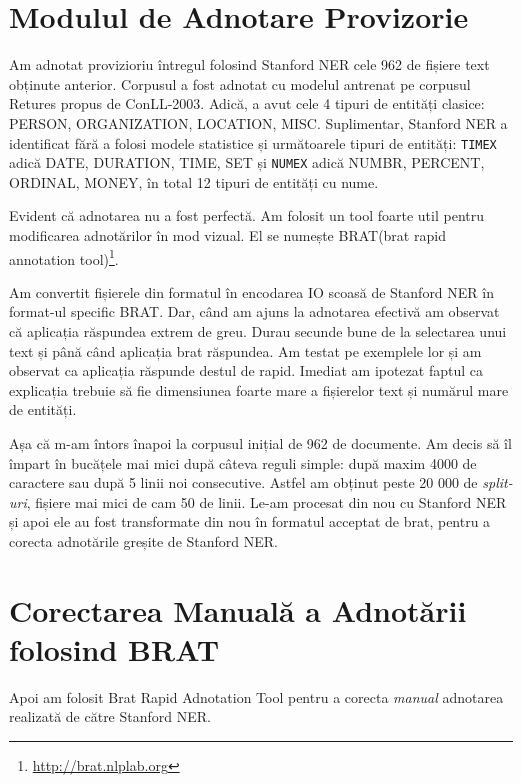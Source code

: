 
\section{Modulul de Adnotare Provizorie}

Am adnotat provizioriu întregul folosind Stanford NER cele 962 de fișiere text obținute anterior. Corpusul a fost adnotat cu modelul antrenat pe corpusul Retures propus de ConLL-2003. Adică, a avut cele 4 tipuri de entități clasice: PERSON, ORGANIZATION, LOCATION, MISC. Suplimentar, Stanford NER a identificat fără a folosi modele statistice și următoarele tipuri de entități: \texttt{TIMEX} adică DATE, DURATION, TIME, SET și \texttt{NUMEX} adică NUMBR, PERCENT, ORDINAL, MONEY, în total 12 tipuri de entități cu nume.

Evident că adnotarea nu a fost perfectă. Am folosit un tool foarte util pentru modificarea adnotărilor în mod vizual. El se numește BRAT(brat rapid annotation tool)\footnote{\url{http://brat.nlplab.org}}.

Am convertit fișierele din formatul în encodarea IO scoasă de Stanford NER în format-ul specific BRAT. Dar, când am ajuns la adnotarea efectivă am observat că aplicația răspundea extrem de greu. Durau secunde bune de la selectarea unui text și până când aplicația brat răspundea. Am testat pe exemplele lor și am observat ca aplicația răspunde destul de rapid. Imediat am ipotezat faptul ca explicația trebuie să fie dimensiunea foarte mare a fișierelor text și numărul mare de entități.

Așa că m-am întors înapoi la corpusul inițial de 962 de documente. Am decis să îl împart în bucățele mai mici după câteva reguli simple: după maxim 4000 de caractere sau după 5 linii noi consecutive. Astfel am obținut peste 20 000 de \textit{split-uri}, fișiere mai mici de cam 50 de linii. Le-am procesat din nou cu Stanford NER și apoi ele au fost transformate din nou în formatul acceptat de brat, pentru a corecta adnotările greșite de Stanford NER.

\section{Corectarea Manuală a Adnotării folosind BRAT}
\label{section:brat-annotation}

Apoi am folosit Brat Rapid Adnotation Tool pentru a corecta \textit{manual} adnotarea realizată de către Stanford NER.

